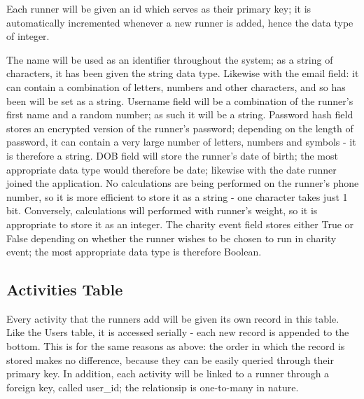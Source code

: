 \documentclass{article}[12pt,a4paper]
\begin{document}
\noindent
Each runner will be given an id which serves as their primary key; it is automatically incremented whenever a new runner is added, hence the data type of integer. 

The name will be used as an identifier throughout the system; as a string of characters, it has been given the string data type. Likewise with the email field: it can contain a combination of letters, numbers and other characters, and so has been will be set as a string. Username field will be a combination of the runner's first name and a random number; as such it will be a string. Password hash field stores an encrypted version of the runner's password; depending on the length of password, it can contain a very large number of letters, numbers and symbols - it is therefore a string. DOB field will store the runner's date of birth; the most appropriate data type would therefore be date; likewise with the date runner joined the application. No calculations are being performed on the runner's phone number, so it is more efficient to store it as a string - one character takes just 1 bit. Conversely, calculations will performed with runner's weight, so it is appropriate to store it as an integer. The charity event field stores either True or False depending on whether the runner wishes to be chosen to run in charity event; the most appropriate data type is therefore Boolean.

\subsection{Activities Table}

Every activity that the runners add will be given its own record in this table. Like the Users table, it is accessed serially - each new record is appended to the bottom. This is for the same reasons as above: the order in which the record is stored makes no difference, because they can be easily queried through their primary key. In addition, each activity will be linked to a runner through a foreign key, called user\_id; the relationsip is one-to-many in nature.
\end{document}
